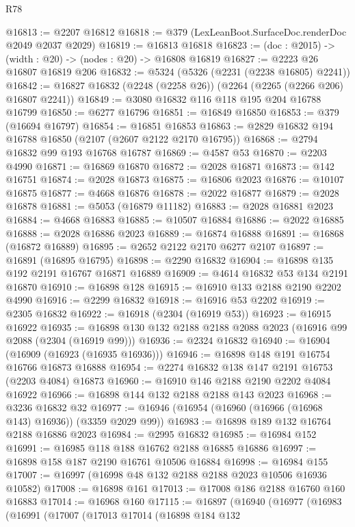 \begin{lexlean}{R78}
\begin{coremodule}
@16813 := @2207 @16812
@16818 := @379 (LexLeanBoot.SurfaceDoc.renderDoc @2049 @2037 @2029)
@16819 := @16813 @16818
@16823 := (doc : @2015) -> (width : @20) -> (nodes : @20) -> @16808 @16819
@16827 := @2223 @26 @16807 @16819 @206
@16832 := @5324 (@5326 (@2231 (@2238 @16805) @2241))
@16842 := @16827 @16832 (@2248 (@2258 @26)) (@2264 (@2265 (@2266 @206) @16807 @2241))
@16849 := @3080 @16832 @116 @118 @195 @204 @16788 @16799
@16850 := @6277 @16796
@16851 := @16849 @16850
@16853 := @379 (@16694 @16797)
@16854 := @16851 @16853
@16863 := @2829 @16832 @194 @16788 @16850 (@2107 (@2607 @2122 @2170 @16795))
@16868 := @2794 @16832 @99 @193 @16768 @16787
@16869 := @4587 @53
@16870 := @2203 @4990
@16871 := @16869 @16870
@16872 := @2028 @16871
@16873 := @142 @16751
@16874 := @2028 @16873
@16875 := @16806 @2023
@16876 := @10107 @16875
@16877 := @4668 @16876
@16878 := @2022 @16877
@16879 := @2028 @16878
@16881 := @5053 (@16879 @11182)
@16883 := @2028 @16881 @2023
@16884 := @4668 @16883
@16885 := @10507 @16884
@16886 := @2022 @16885
@16888 := @2028 @16886 @2023
@16889 := @16874 @16888
@16891 := @16868 (@16872 @16889)
@16895 := @2652 @2122 @2170 @6277 @2107
@16897 := @16891 (@16895 @16795)
@16898 := @2290 @16832
@16904 := @16898 @135 @192 @2191 @16767 @16871 @16889
@16909 := @4614 @16832 @53 @134 @2191 @16870
@16910 := @16898 @128
@16915 := @16910 @133 @2188 @2190 @2202 @4990
@16916 := @2299 @16832
@16918 := @16916 @53 @2202
@16919 := @2305 @16832
@16922 := @16918 (@2304 (@16919 @53))
@16923 := @16915 @16922
@16935 := @16898 @130 @132 @2188 @2188 @2088 @2023 (@16916 @99 @2088 (@2304 (@16919 @99)))
@16936 := @2324 @16832
@16940 := @16904 (@16909 (@16923 (@16935 @16936)))
@16946 := @16898 @148 @191 @16754 @16766 @16873 @16888
@16954 := @2274 @16832 @138 @147 @2191 @16753 (@2203 @4084) @16873
@16960 := @16910 @146 @2188 @2190 @2202 @4084 @16922
@16966 := @16898 @144 @132 @2188 @2188 @143 @2023
@16968 := @3236 @16832 @32
@16977 := @16946 (@16954 (@16960 (@16966 (@16968 @143) @16936)) (@3359 @2029 @99))
@16983 := @16898 @189 @132 @16764 @2188 @16886 @2023
@16984 := @2995 @16832
@16985 := @16984 @152
@16991 := @16985 @118 @188 @16762 @2188 @16885 @16886
@16997 := @16898 @158 @187 @2190 @16761 @10506 @16884
@16998 := @16984 @155
@17007 := @16997 (@16998 @48 @132 @2188 @2188 @2023 @10506 @16936 @10582)
@17008 := @16898 @161
@17013 := @17008 @186 @2188 @16760 @160 @16883
@17014 := @16968 @160
@17115 := @16897
    (@16940
      (@16977
        (@16983
          (@16991
            (@17007
              (@17013
                @17014
                (@16898
                  @184
                  @132

\end{coremodule}
\end{lexlean}
